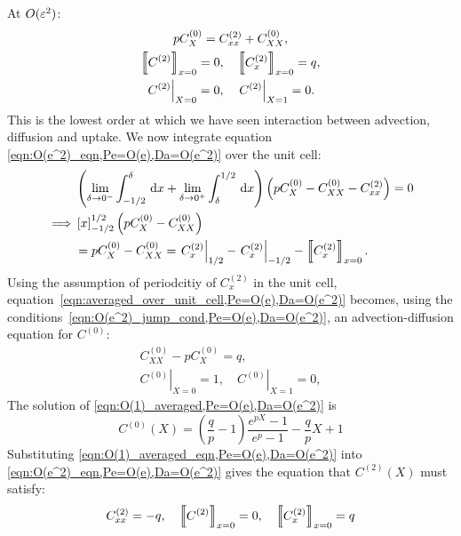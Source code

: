 At \(O(\varepsilon^2)\):
\begin{subequations}
    \label{eqn:O(e^2),Pe=O(e),Da=O(e^2)}
    \begin{gather}
        \label{eqn:O(e^2)_eqn,Pe=O(e),Da=O(e^2)}
        p C^{(0)}_X = C^{(2)}_{xx} + C^{(0)}_{XX},\\
        \label{eqn:O(e^2)_jump_cond,Pe=O(e),Da=O(e^2)}
        \left\llbracket C^{(2)} \right\rrbracket_{x=0}=0, \quad \left\llbracket C^{(2)}_x \right\rrbracket_{x=0}=q,\\
        \label{eqn:O(e^2)_bcs,Pe=O(e),Da=O(e^2)}
        \left.C^{(2)}\right|_{X=0}=0, \quad \left.C^{(2)}\right|_{X=1}=0.
    \end{gather}
\end{subequations}
This is the lowest order at which we have seen interaction between advection,
diffusion and uptake. We now integrate equation
\eqref{eqn:O(e^2)_eqn,Pe=O(e),Da=O(e^2)} over the unit cell:
\begin{align}
    \label{eqn:averaged_over_unit_cell,Pe=O(e),Da=O(e^2)}
    \nonumber &\left(\lim_{\delta \to 0^-} \int_{-1/2}^{\delta}\,\mathrm{d} x +
    \lim_{\delta \to 0^+} \int_{\delta}^{1/2}\,\mathrm{d} x\right)
    \left(p C^{(0)}_X - C^{(0)}_{XX} - C^{(2)}_{xx} \right) = 0\\
    \nonumber \implies & \left[x\right]_{-1/2}^{1/2}\left(p C^{(0)}_X -
    C^{(0)}_{XX}\right)\\
    & = p C^{(0)}_X - C^{(0)}_{XX}
    = \left.C^{(2)}_x\right|_{1/2} - \left.C^{(2)}_x\right|_{-1/2}
    -\left\llbracket C^{(2)}_x \right\rrbracket_{x=0}.
\end{align}
Using the assumption of periodcitiy of \(C^{(2)}_x\) in the unit cell,
equation~\eqref{eqn:averaged_over_unit_cell,Pe=O(e),Da=O(e^2)} becomes, using
the conditions~\eqref{eqn:O(e^2)_jump_cond,Pe=O(e),Da=O(e^2)}, an
advection-diffusion equation for \(C^{(0)}\):
\begin{subequations}
    \label{eqn:O(1)_averaged,Pe=O(e),Da=O(e^2)}
    \begin{gather}
        \label{eqn:O(1)_averaged_eqn,Pe=O(e),Da=O(e^2)}
        C^{(0)}_{XX} - p C^{(0)}_X = q,\\
        \label{eqn:O(1)_averaged_bcs,Pe=O(e),Da=O(e^2)}
        \left.C^{(0)}\right|_{X=0}=1, \quad \left.C^{(0)}\right|_{X=1}=0,
    \end{gather}
\end{subequations}
The solution of \eqref{eqn:O(1)_averaged,Pe=O(e),Da=O(e^2)} is
\begin{equation}
    \label{eqn:C^0(X)_solution,Pe=O(e),Da=O(e^2)}
    C^{(0)}(X) = \left(\frac{q}{p} - 1\right)\frac{e^{pX} - 1}{e^{p} - 1} -
    \frac{q}{p}X + 1
\end{equation}
Substituting \eqref{eqn:O(1)_averaged_eqn,Pe=O(e),Da=O(e^2)} into
\eqref{eqn:O(e^2)_eqn,Pe=O(e),Da=O(e^2)} gives the equation that \(C^{(2)}(X)\)
must satisfy:
\begin{equation}
    \label{eqn:O(e^2)_actual,Pe=O(e),Da=O(e^2)}
    C^{(2)}_{xx} = -q, \quad \left\llbracket C^{(2)} \right\rrbracket_{x=0} = 0, \quad
    \left\llbracket C^{(2)}_x \right\rrbracket_{x=0} = q
\end{equation}

